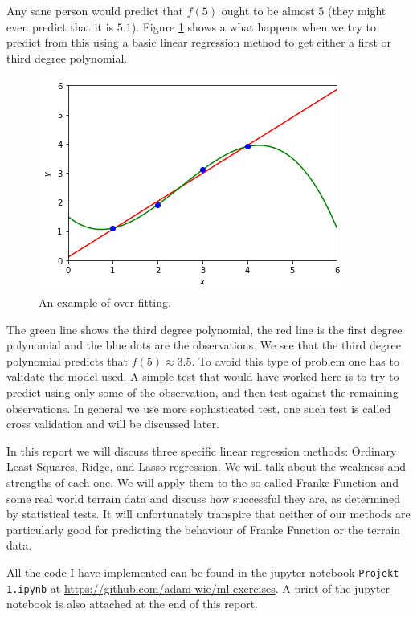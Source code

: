 \documentclass[parskip=half]{scrartcl}
\theoremstyle{definition}
\theoremstyle{remark}
\begin{document}
Any sane person would predict that $f(5)$ ought to be almost $5$ (they might even predict that it is $5.1$). 
Figure \ref{fig:overfitting} shows a what happens when we try to predict from this using a basic linear regression method to get either a first or third degree polynomial.

\begin{figure}[H]
\caption{An example of over fitting.}
\label{fig:overfitting}
\centering
\includegraphics[scale=0.5]{overfitting.png}
\end{figure}

The green line shows the third degree polynomial, the red line is the first degree polynomial and the blue dots are the observations. 
We see that the third degree polynomial predicts that $f(5) \approx 3.5$. 
To avoid this type of problem one has to validate the model used.
A simple test that would have worked here is to try to predict using only some of the observation, and then test against the remaining observations.
In general we use more sophisticated test, one such test is called cross validation and will be discussed later.

In this report we will discuss three specific linear regression methods: Ordinary Least Squares, Ridge, and Lasso regression.
We will talk about the weakness and strengths of each one. 
We will apply them to the so-called Franke Function and some real world terrain data and discuss how successful they are, as determined by statistical tests.
It will unfortunately transpire that neither of our methods are particularly good for predicting the behaviour of Franke Function or the terrain data.

\begin{framed}
All the code I have implemented can be found in the jupyter notebook \texttt{Projekt 1.ipynb} at \url{https://github.com/adam-wie/ml-exercises}.
A print of the jupyter notebook is also attached at the end of this report.
\end{framed}
\end{document}
